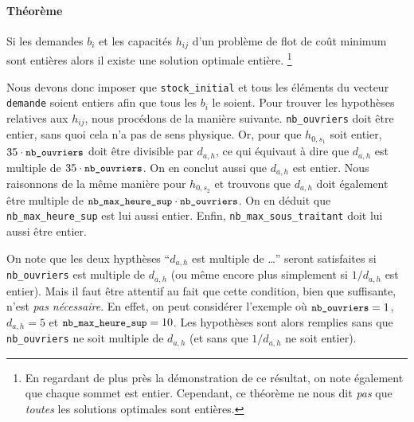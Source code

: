 \paragraph{Théorème}
Si les demandes $b_i$ et les capacités $h_{ij}$ 
d'un problème de flot de coût minimum sont entières alors il existe une solution optimale entière.
\footnote{En regardant de plus près la démonstration de ce résultat,
on note également que chaque sommet est entier. 
Cependant, ce théorème ne nous dit \emph{pas} que \emph{toutes} 
les solutions optimales sont entières.}

Nous devons donc imposer que \texttt{stock\_initial} et tous les éléments du vecteur \texttt{demande} soient entiers afin que tous les $b_i$ le soient. Pour trouver les hypothèses relatives aux $h_{ij}$, nous procédons de la manière suivante. \texttt{nb\_ouvriers} doit être entier, sans quoi cela n'a pas de sens physique. Or, pour que $h_{0, s_1}$ soit entier, $35\cdot {\small\texttt{nb\_ouvriers}}$ doit être divisible par $d_{a,h}$, ce qui équivaut à dire que $d_{a,h}$ est multiple de $35\cdot {\small\texttt{nb\_ouvriers}}$. On en conclut aussi que $d_{a,h}$ est entier. Nous raisonnons de la même manière pour $h_{0, s_2}$ et trouvons que $d_{a,h}$ doit également être multiple de ${\small\texttt{nb\_max\_heure\_sup}}\cdot{\small\texttt{nb\_ouvriers}}$. On en déduit que \texttt{nb\_max\_heure\_sup} est lui aussi entier. Enfin, \texttt{nb\_max\_sous\_traitant} doit lui aussi être entier.

On note que les deux hypthèses ``$d_{a,h}$ est multiple de \dots'' seront satisfaites si \texttt{nb\_ouvriers} est multiple de $d_{a,h}$ (ou même encore plus simplement si $1/d_{a,h}$ est entier). Mais il faut être attentif au fait que cette condition, bien que suffisante, n'est \emph{pas nécessaire}. En effet, on peut considérer l'exemple où ${\small\texttt{nb\_ouvriers}} = 1$, $d_{a,h}=5$ et ${\small\texttt{nb\_max\_heure\_sup}} = 10$. Les hypothèses sont alors remplies sans que \texttt{nb\_ouvriers} ne soit multiple de $d_{a,h}$ (et sans que $1/d_{a,h}$ ne soit entier).
